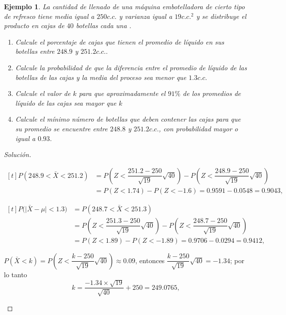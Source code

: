 \documentclass[a5paper,doc,10pt,noapacite]{apa6}
\newtheorem{ejem}{Ejemplo}
\begin{document}
{{\begin{ejem}
	La cantidad de llenado de una máquina embotelladora de cierto tipo de refresco tiene media igual a \(250 c.c.\) y varianza igual a \(19 c.c.^2\) y se distribuye el producto en cajas de \(40\) botellas cada una .
	\begin{enumerate}
		\item Calcule el porcentaje de cajas que tienen el promedio de líquido en sus botellas entre \(248.9\) y \(251.2 c.c.\).
		\item  Calcule la probabilidad de que la diferencia entre el promedio de líquido de las botellas de las cajas y la media del proceso sea menor que \(1.3 c.c.\) 
		\item Calcule el valor de \(k\) para que aproximadamente el \(91\%\) de los promedios de líquido de las cajas sea mayor que \(k\)
		\item Calcule el mínimo número de botellas que deben contener las cajas para que su promedio se encuentre entre \(248.8\) y \(251.2 c.c.\), con probabilidad mayor o igual a \(0.93.\)
	\end{enumerate}
\end{ejem}
\begin{proof}[Solución]\quad
\fontsize{7}{11}\selectfont
	\begin{APAenumerate}
		\item 
		\( \begin{aligned}[t]
		P(248.9<\bar{X}<251.2)&=P\left(Z<\dfrac{251.2-250}{\sqrt{19}}\sqrt{40}\right)-P\left(Z<\dfrac{248.9-250}{\sqrt{19}}\sqrt{40}\right)\\
		&=P(Z<1.74)-P(Z<-1.6)=0.9591-0.0548=0.9043,
		\end{aligned}\)
		
		\vspace{1\baselineskip}
		\item 
		\( \begin{aligned}[t]
		P\big(\big|\bar{X}-\mu\big|<1.3\big)&=P(248.7<\bar{X}<251.3)
		\\ &=P\left(Z<\dfrac{251.3-250}{\sqrt{19}}\sqrt{40}\right)-P\left(Z<\dfrac{248.7-250}{\sqrt{19}}\sqrt{40}\right)\\
		&=P(Z<1.89)-P(Z<-1.89)=0.9706-0.0294=0.9412,
		\end{aligned}\)
		
		\vspace{1\baselineskip}
		\item \(P(\bar{X}<k)=P\left(Z<\dfrac{k-250}{\sqrt{19}}\sqrt{40}\right)\approx0.09\), entonces \(\dfrac{k-250}{\sqrt{19}}\sqrt{40}=-1.34\); por lo tanto
		\[
			k=\dfrac{-1.34 \times \sqrt{19}}{\sqrt{40}}+250=249.0765,
		\]
		

\end{APAenumerate}
\end{proof}}}
\end{document}
